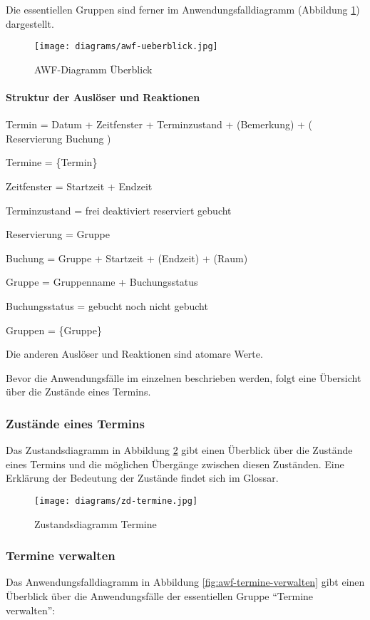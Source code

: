 Die essentiellen Gruppen sind ferner im Anwendungsfalldiagramm (Abbildung \ref{fig:awf-ueberblick}) dargestellt.

\begin{figure}
  \centering
  \texttt{[image: diagrams/awf-ueberblick.jpg]}
  \caption{AWF-Diagramm Überblick}
  \label{fig:awf-ueberblick}
\end{figure}

\paragraph{Struktur der Auslöser und Reaktionen}

Termin = Datum + Zeitfenster + Terminzustand + (Bemerkung) + (
Reservierung \textbar{} Buchung )

Termine = \{Termin\}

Zeitfenster = Startzeit + Endzeit

Terminzustand = frei \textbar{} deaktiviert \textbar{} reserviert \textbar{} gebucht

Reservierung = Gruppe

Buchung = Gruppe + Startzeit + (Endzeit) + (Raum)

Gruppe = Gruppenname + Buchungsstatus

Buchungsstatus = gebucht \textbar{} noch nicht gebucht

Gruppen = \{Gruppe\}

Die anderen Auslöser und Reaktionen sind atomare Werte.

Bevor die Anwendungsfälle im einzelnen beschrieben werden, folgt eine Übersicht über die Zustände eines Termins.

\subsubsection{Zustände eines Termins}
Das Zustandsdiagramm in Abbildung \ref{fig:zd-termine} gibt einen Überblick über die Zustände eines Termins und die möglichen Übergänge zwischen diesen Zuständen. Eine Erklärung der Bedeutung der Zustände findet sich im Glossar.
\begin{figure}
  \centering
  \texttt{[image: diagrams/zd-termine.jpg]}
  \caption{Zustandsdiagramm Termine}
  \label{fig:zd-termine}
\end{figure}

\subsubsection{Termine verwalten}
Das Anwendungsfalldiagramm in Abbildung \ref{fig:awf-termine-verwalten} gibt einen Überblick über die Anwendungsfälle der essentiellen Gruppe ``Termine verwalten'':

